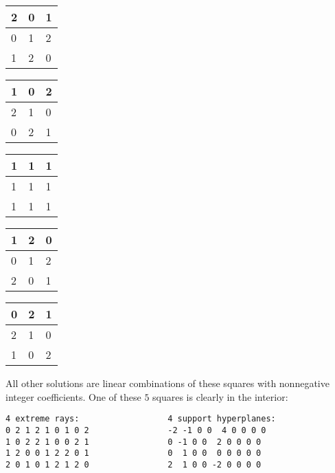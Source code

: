 \documentclass[12pt,a4paper]{scrartcl}
\theoremstyle{definition}
\begin{document}
\begin{center}
	\begin{tabular}{|l|l|l|}
		\hline
		2 & 0 & 1\\
		\hline
		0 & 1 & 2\\
		\hline
		1 & 2 & 0\\
		\hline
	\end{tabular}
	\hspace{10mm}
	\begin{tabular}{|l|l|l|}
		\hline
		1 & 0 & 2\\
		\hline
		2 & 1 & 0\\
		\hline
		0 & 2 & 1\\
		\hline
	\end{tabular}
	\hspace{10mm}
	\begin{tabular}{|l|l|l|}
		\hline
		1 & 1 & 1\\
		\hline
		1 & 1 & 1\\
		\hline
		1 & 1 & 1\\
		\hline
	\end{tabular}
	\hspace{10mm}
	\begin{tabular}{|l|l|l|}
		\hline
		1 & 2 & 0\\
		\hline
		0 & 1 & 2\\
		\hline
		2 & 0 & 1\\
		\hline
	\end{tabular}
	\hspace{10mm}
	\begin{tabular}{|l|l|l|}
		\hline
		0 & 2 & 1\\
		\hline
		2 & 1 & 0\\
		\hline
		1 & 0 & 2\\
		\hline
	\end{tabular}
\end{center}
All other solutions are linear combinations of these squares
with nonnegative integer coefficients.
One of these $5$ squares is clearly in the interior:
\begin{Verbatim}
4 extreme rays:                  4 support hyperplanes:
0 2 1 2 1 0 1 0 2                -2 -1 0 0  4 0 0 0 0
1 0 2 2 1 0 0 2 1                0 -1 0 0  2 0 0 0 0
1 2 0 0 1 2 2 0 1                0  1 0 0  0 0 0 0 0
2 0 1 0 1 2 1 2 0                2  1 0 0 -2 0 0 0 0
\end{Verbatim}
\end{document}
